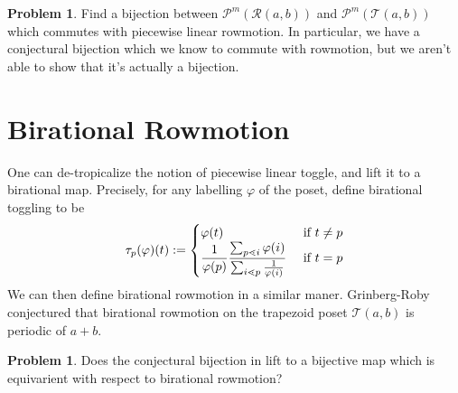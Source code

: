 \documentclass[12pt]{amsart}
\newcommand{\rrr}[0]{\mathscr{R}}
\newcommand{\ttt}[0]{\mathscr{T}}
\theoremstyle{plain}
\theoremstyle{definition}
\newtheorem{problem}[theorem]{Problem}
\newcommand{\cal}[1]{\mathcal{#1}}
\begin{document}
\begin{problem}\label{prob1}
	Find a bijection between $\cal P^m(\rrr(a,b))$ and $\cal P^m(\ttt(a,b))$ which commutes with piecewise linear rowmotion. In particular, we have a conjectural bijection which we know to commute with rowmotion, but we aren't able to show that it's actually a bijection.
\end{problem}
\section{Birational Rowmotion}
One can de-tropicalize the notion of piecewise linear toggle, and lift it to a birational map. Precisely, for any labelling $\varphi$ of the poset, define birational toggling to be
	\[\tau_p(\varphi)(t) := \begin{cases}
		\varphi(t)&\text{ if }t\neq p\\
		{\displaystyle {1\over\varphi(p)}{\sum_{p\lessdot i}\varphi(i)\over \sum_{i\lessdot p}{1\over \varphi(i)}}}
		&\text{ if }t = p
	\end{cases}\]
	We can then define birational rowmotion in a similar maner.
Grinberg-Roby conjectured that birational rowmotion on the trapezoid poset $\ttt(a,b)$ is periodic of $a+b$. 

\begin{problem}
	Does the conjectural bijection in  lift to a bijective map which is equivarient with respect to birational rowmotion?
\end{problem}








\end{document}
